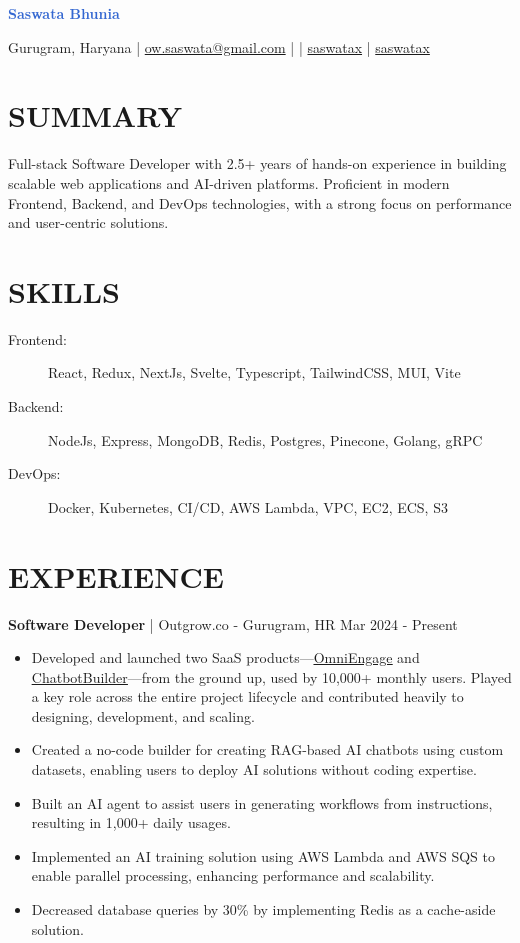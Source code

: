 \documentclass[]{resume}
\begin{document}
\textrm{\Huge\textcolor{highlight}{\textbf{Saswata Bhunia}}}
\vspace{.3em}

Gurugram, Haryana | \href{mailto:ow.saswata@gmail.com}{\faEnvelope \space ow.saswata@gmail.com} | \faPhone {} | \href{https://www.linkedin.com/in/saswatax}{\faLinkedin \space saswatax} | \href{https://github.com/saswatax}{\faGithub \space saswatax}
\vspace{.4em}

\section{SUMMARY}
Full-stack Software Developer with 2.5+ years of hands-on experience in building scalable web applications and AI-driven platforms. Proficient in modern Frontend, Backend, and DevOps technologies, with a strong focus on performance and user-centric solutions.

\section{SKILLS}
\begin{description}
    \item[Frontend:] React, Redux, NextJs, Svelte, Typescript, TailwindCSS, MUI, Vite
    \item[Backend:] NodeJs, Express, MongoDB, Redis, Postgres, Pinecone, Golang, gRPC
    \item[DevOps:] Docker, Kubernetes, CI/CD, AWS Lambda, VPC, EC2, ECS, S3
\end{description}

\section{EXPERIENCE}
\textbf{Software Developer} | Outgrow.co - Gurugram, HR \hfill Mar 2024 - Present
\begin{itemize}
    \item Developed and launched two SaaS products—\uline{\href{https://omniengage.co}{OmniEngage}} and \uline{\href{https://chatbotbuilder.net/}{ChatbotBuilder}}—from the ground up, used by 10,000+ monthly users. Played a key role across the entire project lifecycle and contributed heavily to designing, development, and scaling.
    \item Created a no-code builder for creating RAG-based AI chatbots using custom datasets, enabling users to deploy AI solutions without coding expertise.
    \item Built an AI agent to assist users in generating workflows from instructions, resulting in 1,000+ daily usages.
    \item Implemented an AI training solution using AWS Lambda and AWS SQS to enable parallel processing, enhancing performance and scalability.
    \item Decreased database queries by 30\% by implementing Redis as a cache-aside solution.
\end{itemize}
\vspace{.6em}
\end{document}
